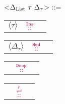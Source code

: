 \documentclass[preview]{standalone}
\begin{document}

\begin{minipage}{\columnwidth}

\begin{grammar}
<$\DeltaList{}\ \tau \ \Delta_{\tau}$> ::= \ %
\alt \synt{$\DeltaAtomic{}\ \tau$} %
\alt \begin{tabular}{p{0.9cm} >{\centering}p{0.9cm} l}$\langle\tau\rangle$
       & $\textcolor{purple}{\overset{\mathtt{Ins}}{::}}$
       & \synt{$\DeltaList{}\ \tau\ \Delta_{\tau}$} \\\end{tabular} %
\alt \begin{tabular}{p{0.9cm} >{\centering}p{0.9cm} l}$\langle\Delta_\tau\rangle$
       & $\textcolor{purple}{\overset{\mathtt{Mod}}{::}}$
       & \synt{$\DeltaList{}\ \tau\ \Delta_{\tau}$} \\\end{tabular}
\alt \begin{tabular}{p{0.9cm} >{\centering}p{0.9cm} l}\quad
       & $\textcolor{purple}{\overset{\mathtt{Drop}}{::}}$
       & \synt{$\DeltaList{}\ \tau\ \Delta_{\tau}$} \\\end{tabular}
\alt \begin{tabular}{p{0.9cm} >{\centering}p{0.9cm} l}\quad
       & $\textcolor{purple}{\overset{\overset{p}{\rightleftarrows}}{::}}$
       & \synt{$\DeltaList{}\ \tau\ \Delta_{\tau}$} \\\end{tabular}
\end{grammar}

\end{minipage}%


\end{document}

